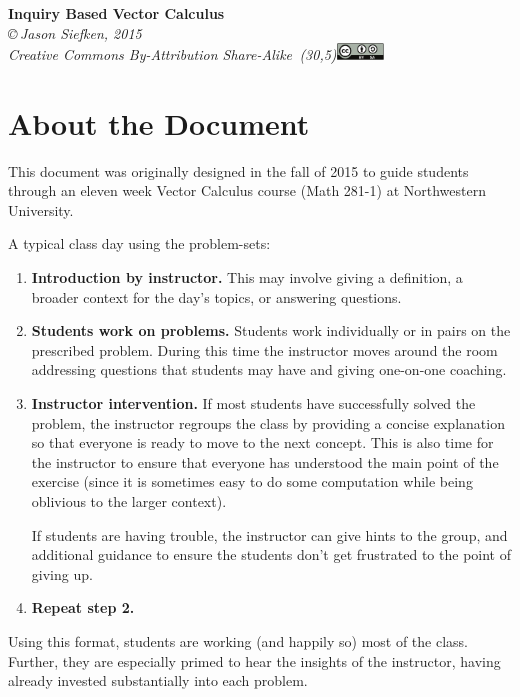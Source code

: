 \documentclass[letter]{article}
\begin{document}
\pagestyle{empty}

\begin{center}
{\huge\bf Inquiry Based Vector Calculus}\\

\vspace{.7in}
{
\it \copyright\,Jason Siefken, 2015 \\
Creative Commons By-Attribution Share-Alike\, \makebox(30,5){\includegraphics[height=1.2em]{by-sa.pdf}}
}
\end{center}

\section*{About the Document}
This document was originally designed in the fall of 2015 to guide students
through an eleven week Vector Calculus course (Math 281-1) at
Northwestern University.  

A typical class day using the problem-sets:
\begin{enumerate}
	\item {\bf Introduction by instructor.} This may involve giving a definition,
		a broader context for the day's topics, or answering questions.
	\item {\bf Students work on problems.} Students work individually or in pairs
		on the prescribed problem.  During this time the instructor moves around
		the room addressing questions that students may have and giving one-on-one
		coaching.
	\item {\bf Instructor intervention.} If most students have successfully solved the 
		problem, the instructor regroups the class by providing a concise 
		explanation so that everyone is ready to move to the next concept.  This
		is also time for the instructor to ensure that everyone has understood the
		main point of the exercise (since it is sometimes easy to do some computation
		while being oblivious to the larger context).

		If students are having trouble, the instructor can give hints to the group,
		and additional guidance to ensure the students don't get frustrated
		to the point of giving up.
	\item {\bf Repeat step 2.}
\end{enumerate}

Using this format, students are working (and happily so) most of the class.
Further, they are especially primed to hear the insights of the instructor, 
having already invested substantially into each problem.
\end{document}
